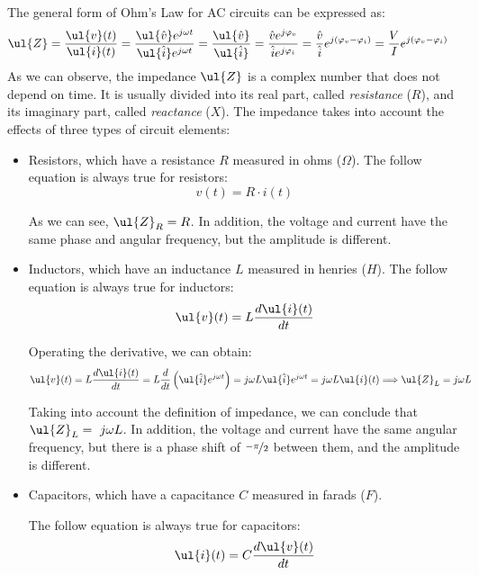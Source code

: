 The general form of Ohm's Law for AC circuits can be expressed as:
\begin{align*}
\ul{Z} &= \frac{\ul{v}(t)}{\ul{i}(t)}
= \frac{\ul{\hat{v}} e^{j\omega t}}{\ul{\hat{i}} e^{j\omega t}}
= \frac{\ul{\hat{v}}}{\ul{\hat{i}}}
= \frac{\hat{v}e^{j\varphi_v}}{\hat{i}e^{j\varphi_i}}
= \frac{\hat{v}}{\hat{i}} e^{j(\varphi_v - \varphi_i)}
= \frac{V}{I} e^{j(\varphi_v - \varphi_i)}
\end{align*}
As we can observe, the impedance $\ul{Z}$ is a complex number that does not depend on time. It is usually divided into its real part, called \textit{resistance} ($R$), and its imaginary part, called \textit{reactance} ($X$). The impedance takes into account the effects of three types of circuit elements:
\begin{itemize}
    \item Resistors, which have a resistance $R$ measured in ohms ($\Omega$). The follow equation is always true for resistors:
    \begin{equation*}
        v(t) = R\cdot i(t)
    \end{equation*}

    As we can see, $\ul{Z}_R = R$. In addition, the voltage and current have the same phase and angular frequency, but the amplitude is different.
    \item Inductors, which have an inductance $L$ measured in henries ($H$). The follow equation is always true for inductors:
    \begin{equation*}
        \ul{v}(t) = L \frac{d\ul{i}(t)}{dt}
    \end{equation*}

    Operating the derivative, we can obtain:
    \begin{align*}
        \ul{v}(t) &= L \frac{d\ul{i}(t)}{dt}
        = L \frac{d}{dt} \left( \ul{\hat{i}} e^{j\omega t} \right)
        = j\omega L \ul{\hat{i}} e^{j\omega t}
        = j\omega L \ul{i}(t)
        \Longrightarrow
        \ul{Z}_L = j\omega L
    \end{align*}

    Taking into account the definition of impedance, we can conclude that $\ul{Z}_L =~j\omega L$. In addition, the voltage and current have the same angular frequency, but there is a phase shift of $\nicefrac{-\pi}{2}$ between them, and the amplitude is different.
    \item Capacitors, which have a capacitance $C$ measured in farads ($F$).
    
    The follow equation is always true for capacitors:
    \begin{equation*}
        \ul{i}(t) = C \frac{d\ul{v}(t)}{dt}
    \end{equation*}


\end{itemize}
